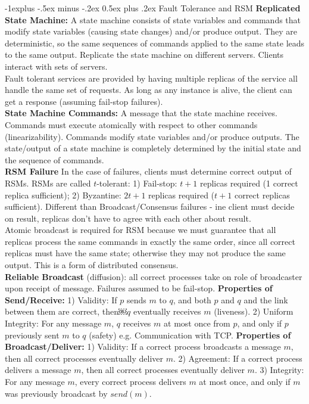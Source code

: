 \documentclass[9pt,landscape]{article}
\makeatletter
\renewcommand{\subsection}{\@startsection{subsection}{2}{0mm}%
                                {-1explus -.5ex minus -.2ex}%
                                {0.5ex plus .2ex}%
                                {\normalfont\normalsize\bfseries}}
\makeatother
\begin{document}
\begin{multicols}{3}
\subsection{Fault Tolerance and RSM}
{\bf Replicated State Machine:} A state machine consists of state variables and commands that modify state variables (causing state changes) and/or produce output. They are deterministic, so the same sequences of commands applied to the same state leads to the same output. Replicate the state machine on different servers. Clients interact with sets of servers.\\
Fault tolerant services are provided by having multiple replicas of the service all handle the same set of requests. As long as any instance is alive, the client can get a response (assuming fail-stop failures).\\
{\bf State Machine Commands:} A message that the state machine receives. 
Commands must execute atomically with respect to other commands (linearizability). Commands modify state variables and/or produce outputs. The state/output of a state machine is completely determined by the initial state and the sequence of commands.\\
{\bf RSM Failure} In the case of failures, clients must determine correct output of RSMs. RSMs are called $t$-tolerant: 1) Fail-stop: $t + 1$ replicas required (1 correct replica sufficient); 2) Byzantine: $2t + 1$ replicas required ($t + 1$ correct replicas sufficient). Different than Broadcast/Consensus failures - ine client must decide on result, replicas don't have to agree with each other about result.\\
Atomic broadcast is required for RSM because we must guarantee that all replicas process the same commands in exactly the same order, since all correct replicas must have the same state; otherwise they may not produce the same output. This is a form of distributed consensus.\\
{\bf Reliable Broadcast} (diffusion): all correct processes take on role of broadcaster upon receipt of message. Failures assumed to be fail-stop.
{\bf Properties of Send/Receive:}
1) Validity: If $p$ sends $m$ to $q$, and both $p$ and $q$ and the link between them are correct, then￼$q$ eventually receives $m$ (liveness). 2) Uniform Integrity: For any message $m$, $q$ receives $m$ at most once from $p$, and only if $p$ previously sent $m$ to $q$ (safety) e.g. Communication with TCP.
{\bf Properties of Broadcast/Deliver:}
1) Validity: If a correct process broadcasts a message $m$, then all correct processes eventually deliver $m$. 2) Agreement: If a correct process delivers a message $m$, then all correct processes eventually deliver $m$. 3) Integrity: For any message $m$, every correct process delivers $m$ at most once, and only if $m$ was previously broadcast by $send(m)$.\\

\end{multicols}
\end{document}
